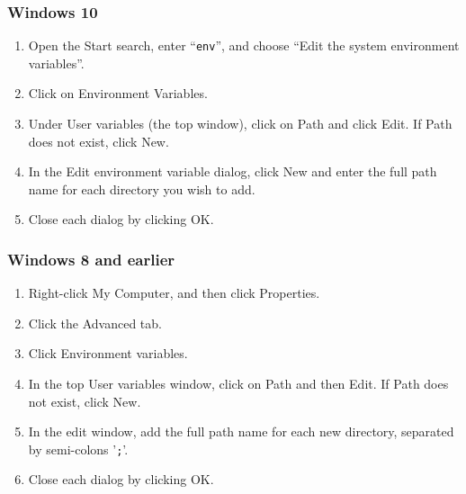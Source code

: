 \ifWindows

\subsubsection{Windows 10}

\begin{enumerate}

\item Open the {\sf Start} search, enter ``{\tt env}'', and choose
{\sf ``Edit the system environment variables''}.

\item Click on {\sf Environment Variables}.

\item Under {\sf User variables} (the top window), click on {\sf Path}
and click {\sf Edit}. If {\sf Path} does not exist, click {\sf New}.

\item In the {\sf Edit environment variable} dialog, click {\sf New}
and enter the full path name for each directory you wish to add.

\item Close each dialog by clicking {\sf OK}.

\end{enumerate}

\subsubsection{Windows 8 and earlier}

\begin{enumerate}

\item Right-click {\sf My Computer}, and then click {\sf Properties}.

\item Click the {\sf Advanced} tab.

\item Click {\sf Environment variables}.

\item In the top {\sf User variables} window, click on {\sf Path} and 
then {\sf Edit}. If {\sf Path} does not exist, click {\sf New}.

\item In the edit window, add the full path name for each new directory,
separated by semi-colons '{\tt ;}'.

\item Close each dialog by clicking {\sf OK}.

\end{enumerate}

